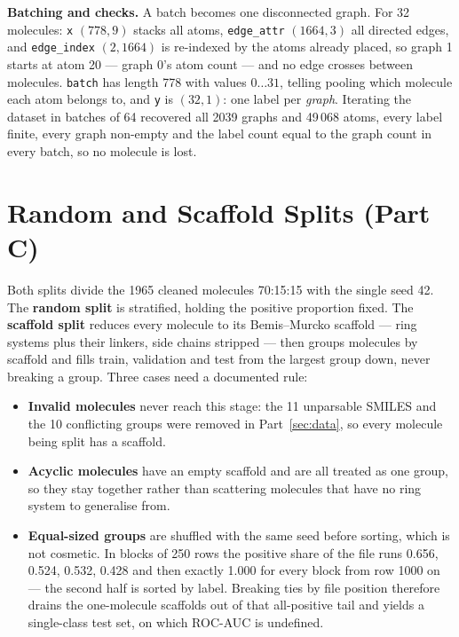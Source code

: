 \documentclass[10pt]{article}
\begin{document}
\textbf{Batching and checks.} A batch becomes one disconnected graph. For 32 molecules: \texttt{x} $(778,9)$ stacks
all atoms, \texttt{edge\_attr} $(1664,3)$ all directed edges, and \texttt{edge\_index} $(2,1664)$ is re-indexed by
the atoms already placed, so graph 1 starts at atom 20 --- graph 0's atom count --- and no edge crosses between
molecules. \texttt{batch} has length 778 with values $0\ldots31$, telling pooling which molecule each atom belongs
to, and \texttt{y} is $(32,1)$: one label per \emph{graph}. Iterating the dataset in batches of 64 recovered all
2039 graphs and 49\,068 atoms, every label finite, every graph non-empty and the label count equal to the graph
count in every batch, so no molecule is lost.

\section{Random and Scaffold Splits (Part C)}
\label{sec:split}

Both splits divide the 1965 cleaned molecules 70:15:15 with the single seed 42. The \textbf{random split} is
stratified, holding the positive proportion fixed. The \textbf{scaffold split} reduces every molecule to its
Bemis--Murcko scaffold \cite{Bemis} --- ring systems plus their linkers, side chains stripped --- then groups
molecules by scaffold and fills train, validation and test from the largest group down, never breaking a group.
Three cases need a documented rule:

\begin{itemize}
    \item \textbf{Invalid molecules} never reach this stage: the 11 unparsable SMILES and the 10 conflicting groups were removed in Part~\ref{sec:data}, so every molecule being split has a scaffold.
    \item \textbf{Acyclic molecules} have an empty scaffold and are all treated as one group, so they stay together rather than scattering molecules that have no ring system to generalise from.
    \item \textbf{Equal-sized groups} are shuffled with the same seed before sorting, which is not cosmetic. In blocks of 250 rows the positive share of the file runs 0.656, 0.524, 0.532, 0.428 and then exactly 1.000 for every block from row 1000 on --- the second half is sorted by label. Breaking ties by file position therefore drains the one-molecule scaffolds out of that all-positive tail and yields a single-class test set, on which ROC-AUC is undefined.
\end{itemize}
\end{document}
